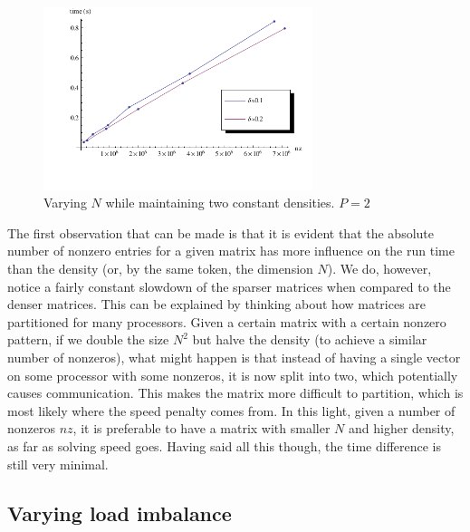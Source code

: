 \documentclass[a4paper]{article}
\newcommand{\plotsize}{0.7\textwidth}
\begin{document}
\begin{figure}[h]
    \begin{center}
        \includegraphics[width=\plotsize]{img/density-run.pdf}
    \end{center}
    \caption{Varying $N$ while maintaining two constant densities. $P=2$}
    \label{fig:density-run}
\end{figure}

The first observation that can be made is that it is evident that the absolute number of
nonzero entries for a given matrix has more influence on the run time than the density
(or, by the same token, the dimension $N$). We do, however, notice a fairly constant
slowdown of the sparser matrices when compared to the denser matrices. This can be explained
by thinking about how matrices are partitioned for many processors. Given a certain matrix with
a certain nonzero pattern, if we double the size $N^2$ but halve the density (to achieve a similar
number of nonzeros), what might happen is that instead of having a single vector on some processor
with some nonzeros, it is now split into two, which potentially causes communication. This makes the
matrix more difficult to partition, which is most likely where the speed penalty comes from. In this
light, given a number of nonzeros $nz$, it is preferable to have a matrix with smaller $N$ and higher
density, as far as solving speed goes. Having said all this though, the time difference is
still very minimal.

\subsection{Varying load imbalance}\label{sec:imbalance-run}
\end{document}
